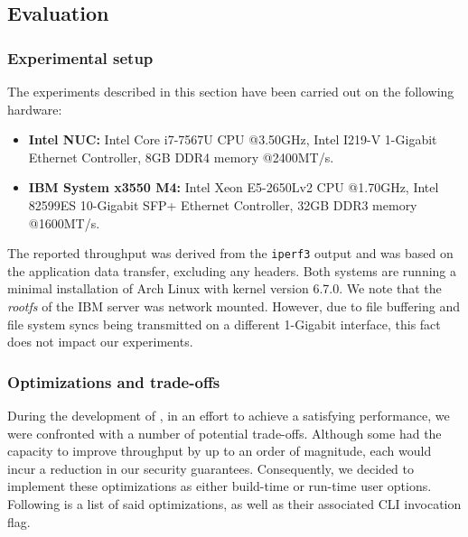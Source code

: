 \subsection{Evaluation}
\label{appfw:daf:evaluation}

\subsubsection{Experimental setup}

The experiments described in this section have been carried out on the following hardware:

\begin{itemize}
    \item \textbf{Intel NUC:} Intel Core i7-7567U CPU @3.50GHz, Intel I219-V 1-Gigabit Ethernet Controller, 8GB DDR4 memory @2400MT/s.
    \item \textbf{IBM System x3550 M4:} Intel Xeon E5-2650Lv2 CPU @1.70GHz, Intel 82599ES 10-Gigabit SFP+ Ethernet Controller, 32GB DDR3 memory @1600MT/s.
\end{itemize}

The reported throughput was derived from the \texttt{iperf3} output and was based on the application data transfer, excluding any headers. Both systems are running a minimal installation of Arch Linux with kernel version 6.7.0. We note that the \textit{rootfs} of the IBM server was network mounted. However, due to file buffering and file system syncs being transmitted on a different 1-Gigabit interface, this fact does not impact our experiments.

\subsubsection{Optimizations and trade-offs}
\label{appfw:daf:optimizations}

During the development of \daf{}, in an effort to achieve a satisfying performance, we were confronted with a number of potential trade-offs. Although some had the capacity to improve throughput by up to an order of magnitude, each would incur a reduction in our security guarantees. Consequently, we decided to implement these optimizations as either build-time or run-time user options. Following is a list of said optimizations, as well as their associated CLI invocation flag.

